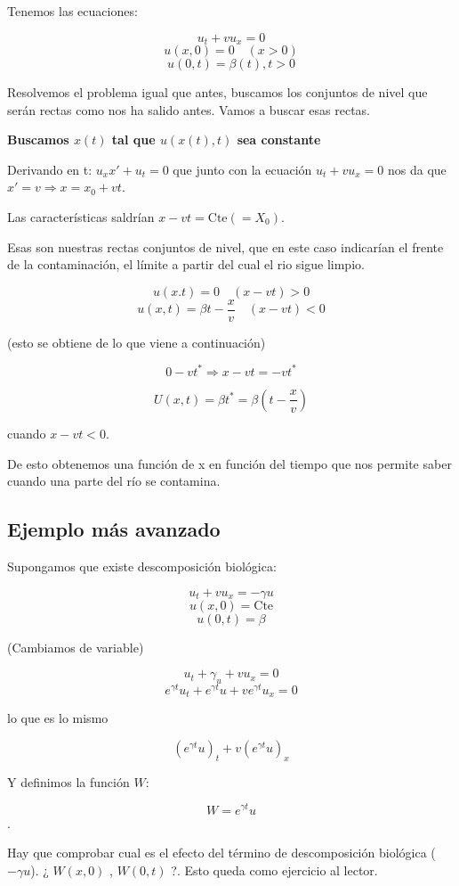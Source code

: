 		Tenemos las ecuaciones:

		$$u_t + vu_x = 0$$
		$$u(x,0) = 0 \quad (x>0) $$
		$$u(0,t) = \beta(t), t>0$$


		Resolvemos el problema igual que antes, buscamos los conjuntos de nivel que serán rectas como nos ha salido antes. Vamos a buscar esas rectas.

		\textbf{Buscamos $x(t)$ tal que $u(x(t),t)$ sea constante}

		Derivando en t: $u_x x' + u_t = 0$ que junto con la ecuación $u_t + v u_x = 0$ nos da que $x' = v \Rightarrow x = x_0 + vt $.

		Las características saldrían $x-vt = \text{Cte}(=X_0)$.

		Esas son nuestras rectas conjuntos de nivel, que en este caso indicarían el frente de la contaminación, el límite a partir del cual el rio sigue limpio.

		$$u(x.t) = 0 \quad(x-vt) > 0 $$
		$$u(x,t) = \beta{t - \frac{x}{v}} \quad (x-vt) < 0 $$

		(esto se obtiene de lo que viene a continuación)

		$$0 - vt^{*} \Rightarrow x-vt = -vt^{*}$$

		$$U(x,t) = \beta{t^*} = \beta(t - \frac{x}{v})$$

		cuando $x - vt < 0$. 

		De esto obtenemos una función de x en función del tiempo que nos permite saber cuando una parte del río se contamina.

	\subsection{Ejemplo más avanzado}

		Supongamos que existe descomposición biológica:

		$$u_t + vu_x = -\gamma u$$
		$$u(x,0) = \text{Cte}$$
		$$u(0,t) = \beta$$

		(Cambiamos de variable)

		$$u_t + \gamma_u + vu_x = 0$$
		$$e^{\gamma t} u_t + e^{\gamma t} u + v e^{ \gamma t} u_x = 0 $$

		lo que es lo mismo 

		$$(e^{\gamma t}u)_t + v (e^{\gamma t} u)_x$$

		Y definimos la función $W$:

		$$W = e^{\gamma t}u$$.


		Hay que comprobar cual es el efecto del término de descomposición biológica ($-\gamma u$). ¿ $W(x,0)$ , $ W(0,t)$ ?. Esto queda como ejercicio al lector.


